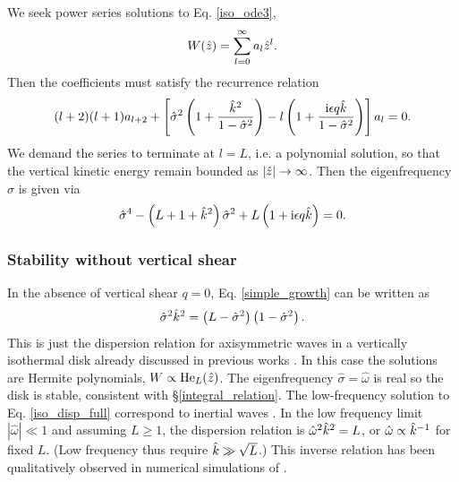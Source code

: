 
We seek power series solutions to Eq. \ref{iso_ode3}, 
\begin{align}
  W(\hat{z}) = \sum_{l=0}^\infty a_l\hat{z}^l. 
\end{align}
Then the coefficients must satisfy the recurrence relation
\begin{align}
  (l+2)(l+1)a_{l+2} +
  \left[\hat{\sigma}^2\left(1+\frac{\hat{k}^2}{1-\hat{\sigma}^2}\right)
    - l\left(1+\frac{\mathrm{i} \epsilon q
        \hat{k}}{1-\hat{\sigma}^2}\right)\right] a_l = 0. 
\end{align}
We demand the series to terminate  at $l=L$, i.e. a polynomial
solution, so that the vertical kinetic energy remain bounded as
$|\hat{z}|\to\infty$.  Then the eigenfrequency $\hat{\sigma}$ is given via 
\begin{align}
\hat{\sigma}^4 - \left(L+1+\hat{k}^2\right)\hat{\sigma}^2 + L\left(1 +
  \mathrm{i}\epsilon q \hat{k}\right) = 0. \label{simple_growth}
\end{align}

\subsubsection{Stability without vertical shear}\label{stable_novshear}
In the absence of vertical shear $q=0$, Eq. \ref{simple_growth} can be
written as \begin{align}
  \hat{\sigma}^2\hat{k}^2 =
  \left(L-\hat{\sigma}^2\right)\left(1-\hat{\sigma}^2\right). \label{iso_disp_full}
\end{align}
This is just the dispersion relation for axisymmetric waves in a
vertically isothermal disk already discussed in previous works 
\citep[e.g.][]{okazaki87,takeuchi98,tanaka02,zhang06,ogilvie13,barker14}. In
this case the solutions are Hermite polynomials, $W\propto
\operatorname{He}_L(\hat{z})$.  The eigenfrequency $\hat{\sigma} = \hat{\omega}$ is real so the disk
is stable, consistent with \S\ref{integral_relation}. The
low-frequency solution to Eq. \ref{iso_disp_full} correspond to
inertial waves \citep{balbus03}. In the low frequency limit
$|\hat{\omega}|\ll 1$ and assuming $L\geq 1 $, the 
dispersion relation is $\hat{\omega}^2\hat{k}^2 = L$, or
$\hat{\omega}\propto \hat{k}^{-1}$ for fixed $L$. (Low frequency thus 
require $\hat{k}\gg \sqrt{L}$.) This inverse relation has been qualitatively
observed in numerical simulations of \cite{stoll14}. 

